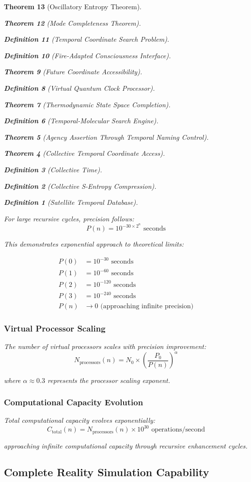 \documentclass[12pt,a4paper]{article}
\newtheorem{theorem}{Theorem}[section]
\newtheorem{definition}[theorem]{Definition}
\begin{document}
\begin{theorem}[Oscillatory Entropy Theorem]
\begin{theorem}[Mode Completeness Theorem]
\begin{enumerate}
\begin{definition}[Temporal Coordinate Search Problem]
\begin{algorithm}
\begin{definition}[Fire-Adapted Consciousness Interface]
\begin{theorem}[Future Coordinate Accessibility]
\begin{definition}[Virtual Quantum Clock Processor]
\begin{itemize}
\begin{itemize}
\begin{theorem}[Thermodynamic State Space Completion]
\begin{definition}[Temporal-Molecular Search Engine]
\begin{theorem}[Agency Assertion Through Temporal Naming Control]
\begin{remark}
\begin{theorem}[Collective Temporal Coordinate Access]
\begin{definition}[Collective Time]
\begin{definition}[Collective S-Entropy Compression]
\begin{definition}[Satellite Temporal Database]
\begin{algorithm}
\begin{table}[h]
{{For large recursive cycles, precision follows:
$$P(n) = 10^{-30 \times 2^n} \text{ seconds}$$

This demonstrates exponential approach to theoretical limits:

\begin{align}
P(0) &= 10^{-30} \text{ seconds} \\
P(1) &= 10^{-60} \text{ seconds} \\
P(2) &= 10^{-120} \text{ seconds} \\
P(3) &= 10^{-240} \text{ seconds} \\
P(n) &\rightarrow 0 \text{ (approaching infinite precision)}
\end{align}

\subsubsection{Virtual Processor Scaling}

The number of virtual processors scales with precision improvement:
$$N_{\text{processors}}(n) = N_0 \times \left(\frac{P_0}{P(n)}\right)^{\alpha}$$

where $\alpha \approx 0.3$ represents the processor scaling exponent.

\subsubsection{Computational Capacity Evolution}

Total computational capacity evolves exponentially:
$$C_{\text{total}}(n) = N_{\text{processors}}(n) \times 10^{30} \text{ operations/second}$$

approaching infinite computational capacity through recursive enhancement cycles.

\subsection{Complete Reality Simulation Capability}

}}
\end{table}
\end{algorithm}
\end{definition}
\end{definition}
\end{definition}
\end{theorem}
\end{remark}
\end{theorem}
\end{definition}
\end{theorem}
\end{itemize}
\end{itemize}
\end{definition}
\end{theorem}
\end{definition}
\end{algorithm}
\end{definition}
\end{enumerate}
\end{theorem}
\end{theorem}
\end{document}
